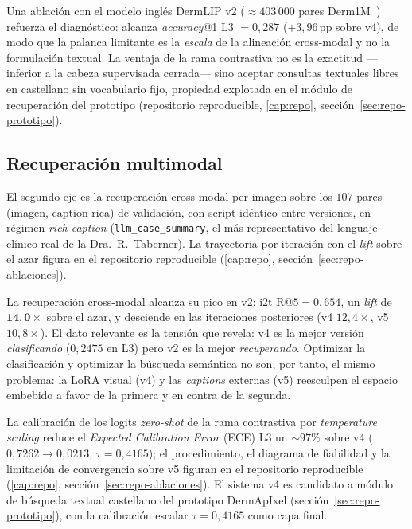 Una ablación con el modelo inglés DermLIP v2 ($\approx 403\,000$ pares
Derm1M~\cite{derm1m}) refuerza el diagnóstico: alcanza
\emph{accuracy}@1 L3 $= 0{,}287$ ($+3{,}96$\,pp sobre v4), de modo que
la palanca limitante es la \emph{escala} de la alineación cross-modal y
no la formulación textual. La ventaja de la rama contrastiva no es la
exactitud ---inferior a la cabeza supervisada cerrada--- sino aceptar
consultas textuales libres en castellano sin vocabulario fijo, propiedad
explotada en el módulo de recuperación del prototipo (repositorio
reproducible, \ref{cap:repo}, sección~\ref{sec:repo-prototipo}).

\subsection{Recuperación multimodal}

El segundo eje es la recuperación cross-modal per-imagen sobre los
$107$ pares (imagen, caption rica) de validación, con script idéntico
entre versiones, en régimen \emph{rich-caption}
(\texttt{llm\_case\_summary}, el más representativo del lenguaje
clínico real de la Dra.~R.~Taberner). La trayectoria por iteración
con el \emph{lift} sobre el azar figura en el repositorio reproducible
(\ref{cap:repo}, sección~\ref{sec:repo-ablaciones}).

La recuperación cross-modal alcanza su pico en v2: i2t R@$5 = 0{,}654$,
un \emph{lift} de $\mathbf{14{,}0\times}$ sobre el azar, y desciende en
las iteraciones posteriores (v4 $12{,}4\times$, v5 $10{,}8\times$). El
dato relevante es
la tensión que revela: v4 es la mejor versión \emph{clasificando}
($0{,}2475$ en L3) pero v2 es la mejor \emph{recuperando}. Optimizar la
clasificación y optimizar la búsqueda semántica no son, por tanto, el
mismo problema: la LoRA visual (v4) y las \emph{captions} externas (v5)
reesculpen el espacio embebido a favor de la primera y en contra de la
segunda.

La calibración de los logits \emph{zero-shot} de la rama contrastiva
por \emph{temperature scaling} reduce el \emph{Expected Calibration
Error} (ECE) L3 un $\sim 97\%$ sobre v4 ($0{,}7262 \to 0{,}0213$,
$\tau = 0{,}4165$); el procedimiento, el diagrama de fiabilidad y la
limitación de convergencia sobre v5 figuran en el
repositorio reproducible (\ref{cap:repo},
sección~\ref{sec:repo-ablaciones}). El sistema v4 es candidato a
módulo de búsqueda textual castellano del prototipo DermApIxel
(sección~\ref{sec:repo-prototipo}), con la calibración escalar $\tau = 0{,}4165$
como capa final.

